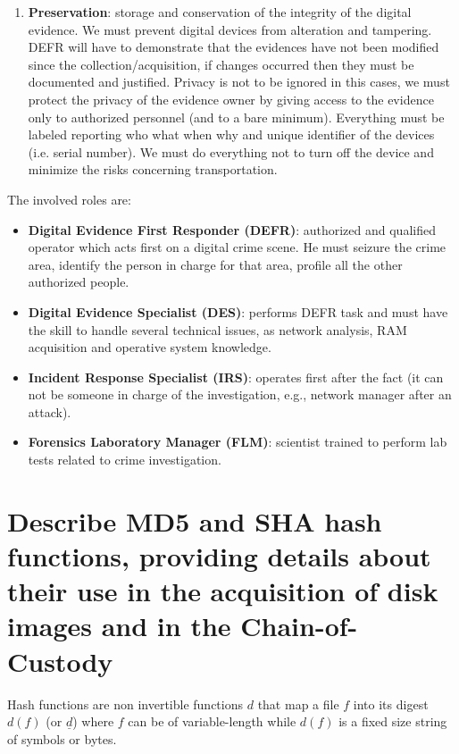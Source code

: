 \documentclass[a4paper, 12pt]{article}
\begin{document}
\begin{enumerate}
    \item \textbf{Preservation}: storage and conservation of the integrity of the digital evidence. We must prevent digital devices from alteration and tampering. DEFR will have to demonstrate that the evidences have not been modified since the collection/acquisition, if changes occurred then they must be documented and justified. Privacy is not to be ignored in this cases, we must protect the privacy of the evidence owner by giving access to the evidence only to authorized personnel (and to a bare minimum). Everything must be labeled reporting who what when why and unique identifier of the devices (i.e. serial number). We must do everything not to turn off the device and minimize the risks concerning
transportation.
\end{enumerate}

The involved roles are:
\begin{itemize}
    \item \textbf{Digital Evidence First Responder (DEFR)}: authorized and qualified operator which acts first on a digital crime scene. He must seizure the crime area, identify the person in charge for that area, profile all the other authorized people.
    
    \item \textbf{Digital Evidence Specialist (DES)}: performs DEFR task and must have the skill to handle several technical issues, as network analysis, RAM acquisition and operative system knowledge.
    
    \item \textbf{Incident Response Specialist (IRS)}: operates first after the fact (it can not be someone in charge of the investigation, e.g., network manager after an attack).
    
    \item \textbf{Forensics Laboratory Manager (FLM)}: scientist trained to perform lab tests related to crime investigation.
\end{itemize}

\section{Describe MD5 and SHA hash functions, providing details about their use in the acquisition of disk images and in the Chain-of-Custody}

Hash functions are non invertible functions $d$ that map a file $f$ into its digest $d(f)$ (or $\underline{d}$) where $f$ can be of variable-length while $d(f)$ is a fixed size string of symbols or bytes.
\end{document}
